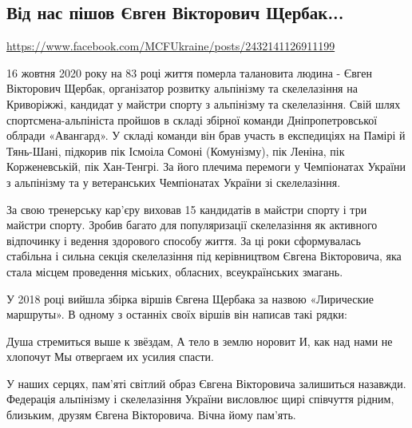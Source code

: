  
 

\subsection{Від нас пішов Євген Вікторович Щербак...}

\url{https://www.facebook.com/MCFUkraine/posts/2432141126911199}

16 жовтня 2020 року на 83 році життя померла талановита людина - Євген
Вікторович Щербак, організатор розвитку альпінізму та скелелазіння на
Криворіжжі, кандидат у майстри спорту з альпінізму та скелелазіння. Свій шлях
спортсмена-альпініста пройшов в складі збірної команди Дніпропетровської
облради «Авангард». У складі команди він брав участь в експедиціях на Памірі й
Тянь-Шані, підкорив пік Ісмоіла Сомоні (Комунізму), пік Леніна, пік
Корженевській, пік Хан-Тенгрі. За його плечима перемоги у Чемпіонатах України з
альпінізму та у ветеранських Чемпіонатах України зі скелелазіння. 

За свою тренерську кар'єру виховав 15 кандидатів в майстри спорту і три майстри
спорту.  Зробив багато для популяризації скелелазіння як активного відпочинку і
ведення здорового способу життя. За ці роки сформувалась стабільна і сильна
секція скелелазіння під керівництвом Євгена Вікторовича, яка стала місцем
проведення міських, обласних, всеукраїнських змагань.

У 2018 році вийшла збірка віршів Євгена Щербака за назвою «Лирические
маршруты». В одному з останніх своїх віршів він написав такі рядки:

Душа стремиться выше к звёздам,
А тело в землю норовит
И, как над нами не хлопочут
Мы отвергаем их усилия спасти.

У наших серцях, пам'яті світлий образ Євгена Вікторовича залишиться назавжди.
Федерація альпінізму і скелелазіння України висловлює щирі співчуття рідним,
близьким, друзям Євгена Вікторовича. Вічна йому пам'ять.

